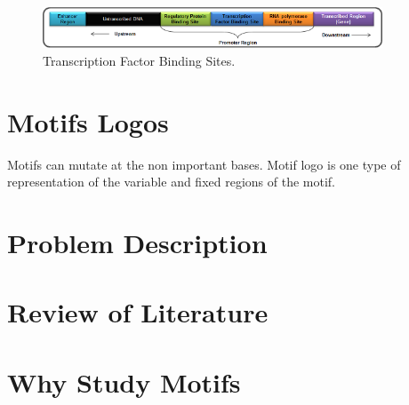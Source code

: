 \begin{figure}[!tb]
	\centering
	\includegraphics[width=0.9\textwidth]{figures/tfbs}
	\caption{Transcription Factor Binding Sites.}
	\label{fig:tfbs}
\end{figure}


\section{Motifs Logos}
Motifs can mutate at the non important bases. Motif logo
is one type of representation of the variable and fixed regions of
the motif. 


\section{Problem Description}
\section{Review of Literature}
\section{Why Study Motifs}


\endinput


%
%
%
%
%				


